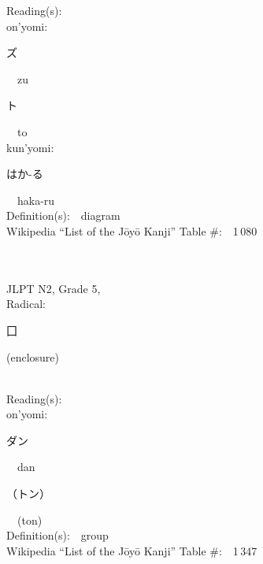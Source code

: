 \begin{multicols}{2}
Reading(s):\ \ \\
{\hspace*{1em}}on'yomi:\ \ \\
{\hspace*{2em}}{\begin{CJK}{UTF8}{min} ズ \end{CJK}}\ \ zu\ \ \\
{\hspace*{2em}}{\begin{CJK}{UTF8}{min} ト \end{CJK}}\ \ to\ \ \\
{\hspace*{1em}}kun'yomi:\ \ \\
{\hspace*{2em}}{\begin{CJK}{UTF8}{min} はか-る \end{CJK}}\ \ haka-ru\ \ \\
Definition(s):\ \ diagram \\
Wikipedia ``List of the J\=oy\=o Kanji'' Table \#:\ \ 1\,080 \\
\ \ \\
{\fontsize{34pt}{40pt}  }\ \ \\  %
{JLPT N2, Grade 5, \\Radical:\ \ {\begin{CJK}{UTF8}{min} 囗 \end{CJK}} (enclosure) } \\
Reading(s):\ \ \\
{\hspace*{1em}}on'yomi:\ \ \\
{\hspace*{2em}}{\begin{CJK}{UTF8}{min} ダン \end{CJK}}\ \ dan\ \ \\
{\hspace*{2em}}{\begin{CJK}{UTF8}{min} （トン） \end{CJK}}\ \ (ton)\ \ \\
Definition(s):\ \ group \\
Wikipedia ``List of the J\=oy\=o Kanji'' Table \#:\ \ 1\,347 \\
\ \ \\
\end{multicols}


